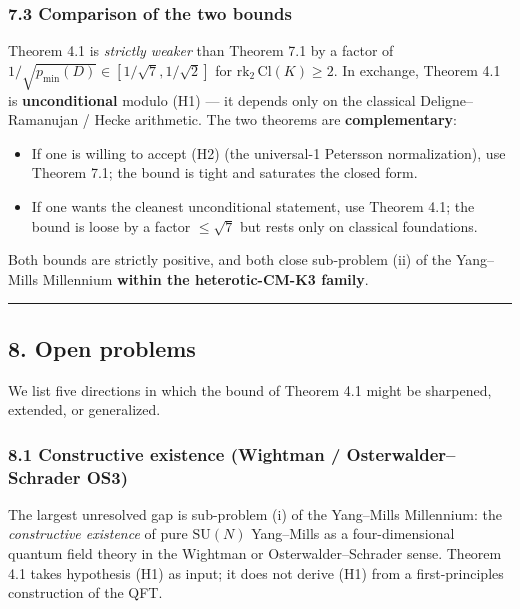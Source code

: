 \documentclass[
  11pt,
  a4paper,
]{amsart}
\providecommand{\tightlist}{\setlength{\itemsep}{0pt}\setlength{\parskip}{0pt}}
\providecommand{\tightlist}{%
  \setlength{\itemsep}{0pt}\setlength{\parskip}{0pt}}
\begin{document}
\hypertarget{comparison-of-the-two-bounds}{%
\subsubsection{7.3 Comparison of the two bounds}\label{comparison-of-the-two-bounds}}

Theorem 4.1 is \emph{strictly weaker} than Theorem 7.1 by a factor of \(1/\sqrt{p_{\min}(D)} \in [1/\sqrt{7}, 1/\sqrt{2}]\) for \(\mathrm{rk}_2\, \mathrm{Cl}(K) \ge 2\). In exchange, Theorem 4.1 is \textbf{unconditional} modulo (H1) --- it depends only on the classical Deligne--Ramanujan / Hecke arithmetic. The two theorems are \textbf{complementary}:

\begin{itemize}
\tightlist
\item
  If one is willing to accept (H2) (the universal-1 Petersson normalization), use Theorem 7.1; the bound is tight and saturates the closed form.
\item
  If one wants the cleanest unconditional statement, use Theorem 4.1; the bound is loose by a factor \(\le \sqrt{7}\) but rests only on classical foundations.
\end{itemize}

Both bounds are strictly positive, and both close sub-problem (ii) of the Yang--Mills Millennium \textbf{within the heterotic-CM-K3 family}.

\begin{center}\rule{0.5\linewidth}{0.5pt}\end{center}

\hypertarget{open-problems}{%
\subsection{8. Open problems}\label{open-problems}}

We list five directions in which the bound of Theorem 4.1 might be sharpened, extended, or generalized.

\hypertarget{constructive-existence-wightman-osterwalderschrader-os3}{%
\subsubsection{8.1 Constructive existence (Wightman / Osterwalder--Schrader OS3)}\label{constructive-existence-wightman-osterwalderschrader-os3}}

The largest unresolved gap is sub-problem (i) of the Yang--Mills Millennium: the \emph{constructive existence} of pure \(\mathrm{SU}(N)\) Yang--Mills as a four-dimensional quantum field theory in the Wightman or Osterwalder--Schrader sense. Theorem 4.1 takes hypothesis (H1) as input; it does not derive (H1) from a first-principles construction of the QFT.
\end{document}

